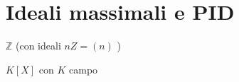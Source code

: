 \section{Ideali massimali e PID}
\begin{example}{}
    \(\mathbb{Z}\) (con ideali \(nZ = (n)\) )
\end{example}
\begin{example}{}
    \(K[X]\) con \(K\) campo
\end{example}
